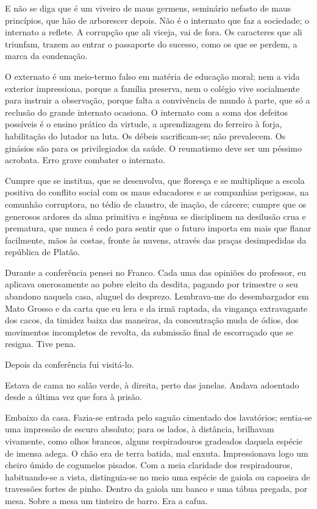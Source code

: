E não se diga que é um
viveiro de maus germens, seminário nefasto de maus princípios, que hão
de arborescer depois. Não é o internato que faz a sociedade; o
internato a reflete. A corrupção que ali
viceja, vai de fora. Os caracteres que ali triunfam, trazem ao entrar o
passaporte do sucesso, como os que se perdem, a marca da condenação. 

O externato é um meio{}-termo falso em matéria de educação moral; nem a
vida exterior impressiona, porque a família preserva, nem o colégio
vive socialmente para instruir a observação, porque falta a convivência
de mundo à parte, que só a reclusão do grande internato ocasiona. O
internato com a soma dos defeitos possíveis é o ensino prático da
virtude, a aprendizagem do ferreiro à forja, habilitação do lutador na
luta. Os débeis sacrificam{}-se; não prevalecem. Os ginásios são para
os privilegiados da saúde. O reumatismo deve ser um péssimo acrobata.
Erro grave combater o internato. 

Cumpre que se institua, que se
desenvolva, que floresça e se multiplique a escola positiva do conflito
social com os maus educadores e as companhias perigosas, na comunhão
corruptora, no tédio de claustro, de inação, de cárcere; cumpre que os
generosos ardores da alma primitiva e ingênua se disciplinem na
desilusão crua e prematura, que nunca é cedo para sentir que o futuro
importa em mais que flanar facilmente, mãos às costas, fronte às
nuvens, através das praças desimpedidas da república de Platão. 

Durante a conferência pensei no Franco. Cada uma das opiniões do professor, eu
aplicava onerosamente ao pobre eleito da desdita, pagando por trimestre
o seu abandono naquela casa, aluguel do desprezo. Lembrava{}-me do
desembargador em Mato Grosso e da carta que eu lera e da irmã raptada,
da vingança extravagante dos cacos, da timidez baixa das maneiras, da
concentração muda de ódios, dos movimentos incompletos de revolta, da
submissão final de escorraçado que se resigna. Tive pena. 

Depois da conferência fui visitá{}-lo. 

Estava de cama no salão verde, à direita,
perto das janelas. Andava adoentado desde a última vez que fora à
prisão. 

Embaixo da casa. Fazia{}-se entrada pelo saguão cimentado dos
lavatórios; sentia{}-se uma impressão de escuro absoluto; para os
lados, à distância, brilhavam vivamente, como olhos brancos, alguns
respiradouros gradeados daquela espécie de imensa adega. O chão era de
terra batida, mal enxuta. Impressionava logo um cheiro úmido de
cogumelos pisados. Com a meia claridade dos respiradouros,
habituando{}-se a vista, distinguia{}-se no meio uma espécie de gaiola
ou capoeira de travessões fortes de pinho. Dentro da gaiola um banco e
uma tábua pregada, por mesa. Sobre a mesa um tinteiro de barro. Era a
cafua. 

